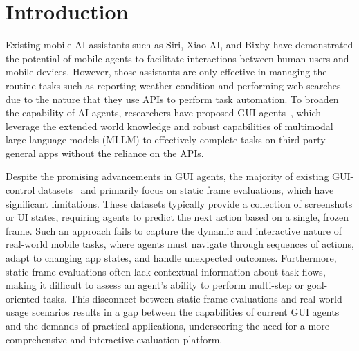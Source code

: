 \documentclass[11pt]{article}
\begin{document}
\section{Introduction}


Existing mobile AI assistants such as Siri, Xiao AI, and Bixby have demonstrated the potential of mobile agents to facilitate interactions between human users and mobile devices. However, those assistants are only effective in managing the routine tasks such as reporting weather condition and performing web searches due to the nature that they use APIs to perform task automation. To broaden the capability of AI agents, researchers have proposed GUI agents~\citep{liu2025llm}, which leverage the extended world knowledge and robust capabilities of multimodal large language models (MLLM) to effectively complete tasks on third-party general apps without the reliance on the APIs. 


Despite the promising advancements in GUI agents, the majority of existing GUI-control datasets~\citep{rawles2024androidinthewild, chai2024amex, li2024androidcontrol} and primarily focus on static frame evaluations, which have significant limitations. These datasets typically provide a collection of screenshots or UI states, requiring agents to predict the next action based on a single, frozen frame. Such an approach fails to capture the dynamic and interactive nature of real-world mobile tasks, where agents must navigate through sequences of actions, adapt to changing app states, and handle unexpected outcomes. Furthermore, static frame evaluations often lack contextual information about task flows, making it difficult to assess an agent’s ability to perform multi-step or goal-oriented tasks. This disconnect between static frame evaluations and real-world usage scenarios results in a gap between the capabilities of current GUI agents and the demands of practical applications, underscoring the need for a more comprehensive and interactive evaluation platform.
\end{document}

